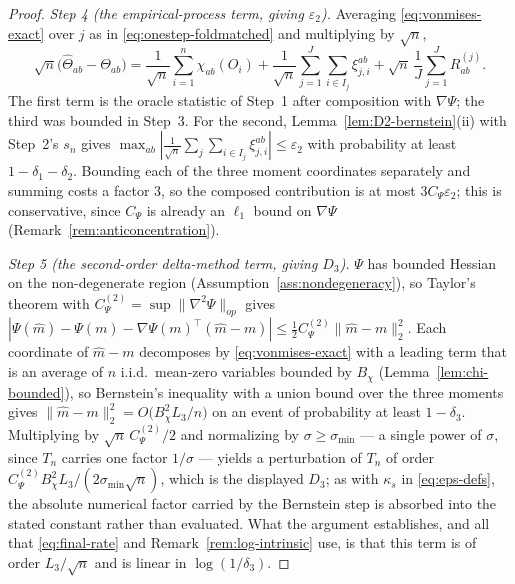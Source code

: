 \documentclass[11pt]{article}
\theoremstyle{plain}
\theoremstyle{definition}
\theoremstyle{remark}
\begin{document}
\begin{proof}
\emph{Step 4 (the empirical-process term, giving $\varepsilon_2$).} Averaging
\eqref{eq:vonmises-exact} over $j$ as in \eqref{eq:onestep-foldmatched} and multiplying by
$\sqrt n$,
\[
    \sqrt n\big(\hat\Theta_{ab}-\Theta_{ab}\big)
    =\frac1{\sqrt n}\sum_{i=1}^n\chi_{ab}(O_i)
    +\frac1{\sqrt n}\sum_{j=1}^J\sum_{i\in I_j}\xi^{ab}_{j,i}
    +\sqrt n\,\frac1J\sum_{j=1}^JR^{(j)}_{ab}.
\]
The first term is the oracle statistic of Step~1 after composition with $\nabla\Psi$; the
third was bounded in Step~3. For the second, Lemma~\ref{lem:D2-bernstein}(ii) with
Step~2's $s_n$ gives $\max_{ab}|\frac1{\sqrt n}\sum_j\sum_{i\in I_j}\xi^{ab}_{j,i}|\le\varepsilon_2$
with probability at least $1-\delta_1-\delta_2$. Bounding each of the three moment
coordinates separately and summing costs a factor $3$, so the composed contribution is at
most $3C_\Psi\varepsilon_2$; this is conservative, since $C_\Psi$ is already an
$\ell_1$ bound on $\nabla\Psi$ (Remark~\ref{rem:anticoncentration}).

\emph{Step 5 (the second-order delta-method term, giving $D_3$).} $\Psi$ has bounded
Hessian on the non-degenerate region (Assumption~\ref{ass:nondegeneracy}), so Taylor's
theorem with $C^{(2)}_\Psi=\sup\|\nabla^2\Psi\|_{op}$ gives
$|\Psi(\hat m)-\Psi(m)-\nabla\Psi(m)^\top(\hat m-m)|\le\tfrac12C^{(2)}_\Psi\|\hat m-m\|_2^2$.
Each coordinate of $\hat m-m$ decomposes by \eqref{eq:vonmises-exact} with a leading term
that is an average of $n$ i.i.d.\ mean-zero variables bounded by $B_\chi$
(Lemma~\ref{lem:chi-bounded}), so Bernstein's inequality
\citep[Thm.~2.10]{BoucheronLugosiMassart2013} with a union bound over the three moments
gives $\|\hat m-m\|_2^2=O\big(B_\chi^2L_3/n\big)$ on an event of probability at least
$1-\delta_3$. Multiplying by $\sqrt n\,C^{(2)}_\Psi/2$ and normalizing by
$\sigma\ge\sigma_{\min}$ --- a single power of $\sigma$, since $T_n$ carries one factor
$1/\sigma$ --- yields a perturbation of $T_n$ of order
$C^{(2)}_\Psi B_\chi^2L_3/(2\sigma_{\min}\sqrt n)$, which is the displayed $D_3$; as with
$\kappa_s$ in \eqref{eq:eps-defs}, the absolute numerical factor carried by the Bernstein
step is absorbed into the stated constant rather than evaluated. What the argument
establishes, and all that \eqref{eq:final-rate} and Remark~\ref{rem:log-intrinsic} use, is
that this term is of order $L_3/\sqrt n$ and is linear in $\log(1/\delta_3)$.


\end{proof}
\end{document}
